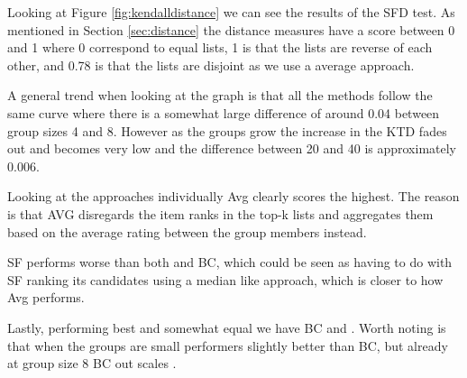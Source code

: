 Looking at Figure \ref{fig:kendalldistance} we can see the results of the SFD test. As mentioned in Section \ref{sec:distance} the distance measures have a score between 0 and 1 where 0 correspond to equal lists, 1 is that the lists are reverse of each other, and 0.78 is that the lists are disjoint as we use a average approach. 

A general trend when looking at the graph is that all the methods follow the same curve where there is a somewhat large difference of around 0.04 between group sizes 4 and 8. However as the groups grow the increase in the KTD fades out and becomes very low and the difference between 20 and 40 is approximately 0.006. 

Looking at the approaches individually Avg clearly scores the highest. The reason is that AVG disregards the item ranks in the top-k lists and aggregates them based on the average rating between the group members instead.

SF performs worse than both \MC and BC, which could be seen as having to do with SF ranking its candidates using a median like approach, which is closer to how Avg performs.
   

Lastly, performing best and somewhat equal we have BC and \MC. Worth noting is that when the groups are small \MC performers slightly better than BC, but already at group size 8 BC out scales \MC.

